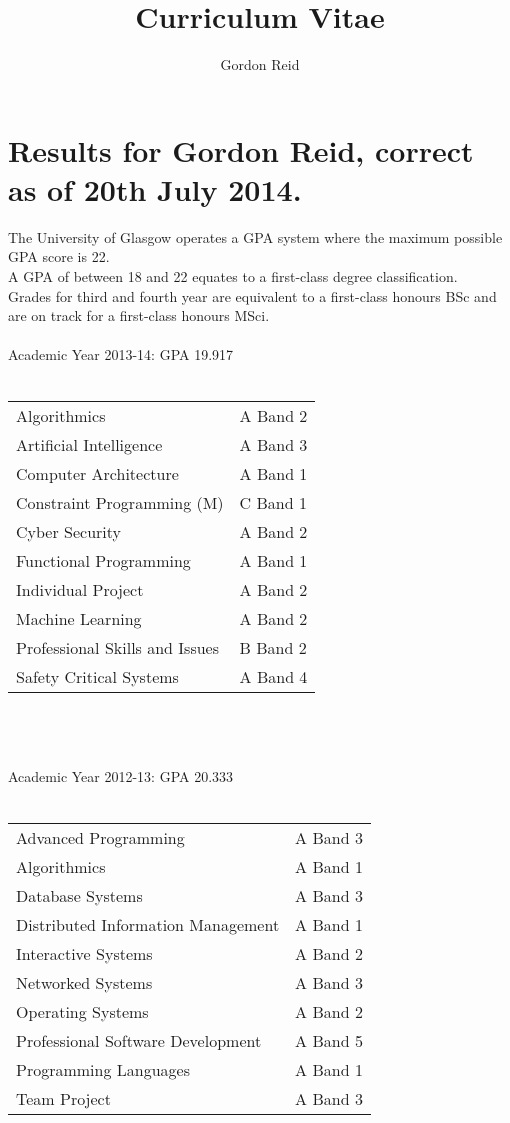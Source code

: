 \documentclass[10pt,a4paper]{article}
\title{Curriculum Vitae}
\author{Gordon Reid}
\begin{document}
\section*{Results for Gordon Reid, correct as of 20th July 2014.}
The University of Glasgow operates a GPA system where the maximum possible
GPA score is 22.\\
A GPA of between 18 and 22 equates to a first-class degree classification.\\
Grades for third and fourth year are equivalent to a first-class honours
BSc and are on track for a first-class honours MSci.\\\\
Academic Year 2013-14: GPA 19.917\\\\
\begin{tabular}{p{10cm}l}
	Algorithmics & A Band 2\\
	Artificial Intelligence & A Band 3\\
	Computer Architecture & A Band 1\\
	Constraint Programming (M) & C Band 1\\
	Cyber Security & A Band 2\\
	Functional Programming & A Band 1\\
	Individual Project & A Band 2\\
	Machine Learning & A Band 2\\
	Professional Skills and Issues & B Band 2\\
	Safety Critical Systems & A Band 4\\
\end{tabular}
\\\\\\
Academic Year 2012-13: GPA 20.333\\\\
\begin{tabular}{p{10cm}l}
    Advanced Programming & A Band 3\\
	Algorithmics & A Band 1\\
    Database Systems & A Band 3\\
    Distributed Information Management & A Band 1\\
    Interactive Systems & A Band 2\\
    Networked Systems & A Band 3\\
	Operating Systems & A Band 2\\
	Professional Software Development & A Band 5\\
	Programming Languages & A Band 1\\
	Team Project & A Band 3\\
\end{tabular}
\end{document}
